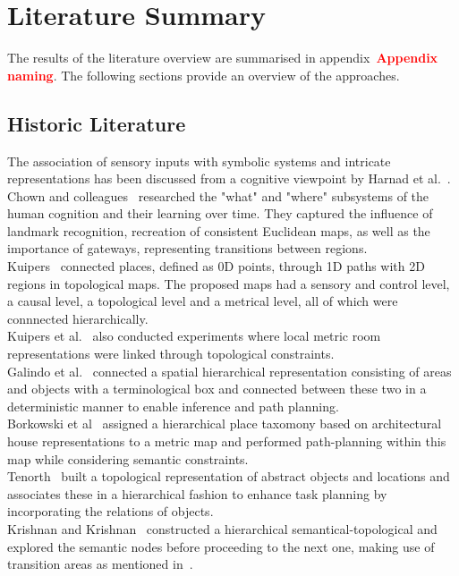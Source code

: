\documentclass[twocolumn,letterpaper]{IEEEAerospaceCLS}  %
\newcommand\todo[1]{\textbf{\textcolor{red}{#1}}}
\begin{document}
\section{Literature Summary} \label{sec:Lit}
The results of the literature overview are summarised in appendix~\todo{Appendix naming}. The following sections provide an overview of the approaches.

\subsection{Historic Literature} \label{subsec:LitHist}
The association of sensory inputs with symbolic systems and intricate representations has been discussed from a cognitive viewpoint by Harnad et al.~\cite{harnad_symbol_1990}.\\
Chown and colleagues~\cite{chown_prototypes_1995} researched the "what" and "where" subsystems of the human cognition and their learning over time. They captured the influence of landmark recognition, recreation of consistent Euclidean maps, as well as the importance of gateways, representing transitions between regions.\\
Kuipers~\cite{kuipers_spatial_2000} connected places, defined as 0D points, through 1D paths with 2D regions in topological maps. The proposed maps had a sensory and control level, a causal level, a topological level and a metrical level, all of which were connnected hierarchically.\\ Kuipers et al.~\cite{kuipers_local_2004} also conducted experiments where local metric room representations were linked through topological constraints.\\ 
Galindo et al.~\cite{galindo_robot_2008} connected a spatial hierarchical representation consisting of areas and objects with a terminological box and connected between these two in a deterministic manner to enable inference and path planning.\\
Borkowski et al~\cite{borkowski_towards_2010} assigned a hierarchical place taxomony based on architectural house representations to a metric map and performed path-planning within this map while considering semantic constraints.\\
Tenorth~\cite{tenorth_knowrob-map_2010} built a topological representation of abstract objects and locations and associates these in a hierarchical fashion to enhance task planning by incorporating the relations of objects.\\
Krishnan and Krishnan~\cite{krishnan_visual_2010} constructed a hierarchical semantical-topological and explored the semantic nodes before proceeding to the next one, making use of transition areas as mentioned in~\cite{chown_prototypes_1995}.
\end{document}
